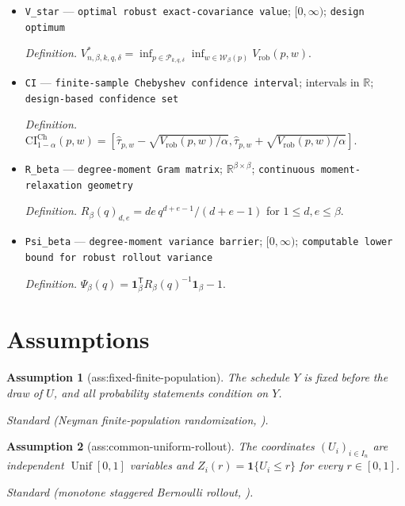 \documentclass{article}
\newtheorem{assumption}{Assumption}
\begin{document}
\begin{itemize}
  \item \texttt{V\_\allowbreak{}star} --- \texttt{optimal robust exact-\allowbreak{}covariance value}; \([0,\infty)\); \texttt{design optimum}
  \par\smallskip\noindent\emph{Definition.} \(V^*_{n,\beta,k,q,\delta}=\inf_{p\in\mathcal P_{k,q,\delta}}\inf_{w\in\mathcal W_\beta(p)}V_{\mathrm{rob}}(p,w)\).
  \item \texttt{CI} --- \texttt{finite-\allowbreak{}sample Chebyshev confidence interval}; intervals in \(\mathbb R\); \texttt{design-\allowbreak{}based confidence set}
  \par\smallskip\noindent\emph{Definition.} \(\mathrm{CI}^{\mathrm{Ch}}_{1-\alpha}(p,w)=[\widehat\tau_{p,w}-\sqrt{V_{\mathrm{rob}}(p,w)/\alpha},\widehat\tau_{p,w}+\sqrt{V_{\mathrm{rob}}(p,w)/\alpha}]\).
  \item \texttt{R\_\allowbreak{}beta} --- \texttt{degree-\allowbreak{}moment Gram matrix}; \(\mathbb R^{\beta\times\beta}\); \texttt{continuous moment-\allowbreak{}relaxation geometry}
  \par\smallskip\noindent\emph{Definition.} \(R_\beta(q)_{d,e}=de\,q^{d+e-1}/(d+e-1)\) for \(1\le d,e\le\beta\).
  \item \texttt{Psi\_\allowbreak{}beta} --- \texttt{degree-\allowbreak{}moment variance barrier}; \([0,\infty)\); \texttt{computable lower bound for robust rollout variance}
  \par\smallskip\noindent\emph{Definition.} \(\Psi_\beta(q)=\mathbf 1_\beta^{\mathsf T}R_\beta(q)^{-1}\mathbf 1_\beta-1\).
\end{itemize}

\section{Assumptions}

\begin{assumption}[ass:fixed-finite-population]\label{ass:fixed-finite-population}
The schedule \(Y\) is fixed before the draw of \(U\), and all probability statements condition on \(Y\).
\par\smallskip\noindent\emph{Standard} (Neyman finite-population randomization, \cite{BasseAiroldi2018}).
\end{assumption}

\begin{assumption}[ass:common-uniform-rollout]\label{ass:common-uniform-rollout}
The coordinates \((U_i)_{i\in I_n}\) are independent \(\operatorname{Unif}[0,1]\) variables and \(Z_i(r)=\mathbf 1\{U_i\le r\}\) for every \(r\in[0,1]\).
\par\smallskip\noindent\emph{Standard} (monotone staggered Bernoulli rollout, \cite{CortezEichhornYu2022}).
\end{assumption}
\end{document}
